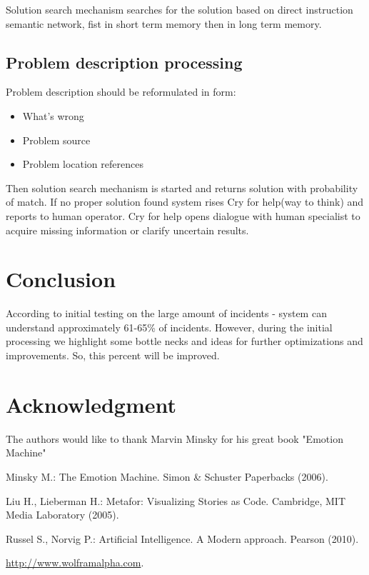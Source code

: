 \documentclass[conference]{IEEEtran}
\begin{document}
Solution search mechanism searches for the solution based on direct instruction semantic network, fist in short term memory then in long term memory.

\subsection{Problem description processing}

Problem description should be reformulated in form:
\begin{itemize}
  \item What's wrong
  \item Problem source
  \item Problem location references
\end{itemize}

Then solution search mechanism is started and returns solution with probability of match. If no proper solution found system rises Cry for help(way to think) and reports to human operator.
Cry for help opens dialogue with human specialist to acquire missing information or clarify uncertain results.

\section{Conclusion}

According to initial testing on the large amount of incidents - system can understand approximately 61-65\% of incidents. However, during the initial processing we highlight some bottle necks and ideas for further optimizations and improvements. So, this percent will be improved.

\section*{Acknowledgment}
The authors would like to thank Marvin Minsky for his great book "Emotion Machine" \cite{minsk}

\begin{thebibliography}{4}

Minsky M.:
The Emotion Machine.
Simon \& Schuster Paperbacks  (2006).

Liu H., Lieberman H.:
Metafor: Visualizing Stories as Code.
Cambridge, MIT Media Laboratory  (2005).

Russel S., Norvig P.:
Artificial Intelligence. A Modern approach.
Pearson (2010).

\href{http://www.wolframalpha.com}{http://www.wolframalpha.com}.

\end{thebibliography}
\end{document}
